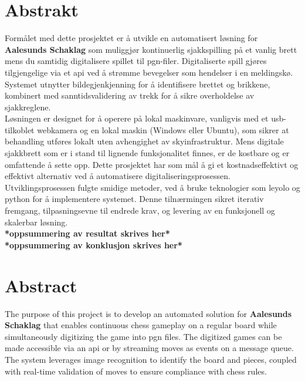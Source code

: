 \chapter*{Abstrakt}

Formålet med dette prosjektet er å utvikle en automatisert løsning for \textbf{Aalesunds Schaklag} som muliggjør kontinuerlig sjakkspilling på et vanlig brett mens du samtidig digitalisere spillet til \gls{pgn}-filer. Digitaliserte spill gjøres tilgjengelige via et \gls{api} ved å strømme bevegelser som hendelser i en meldingskø. Systemet utnytter bildegjenkjenning for å identifisere brettet og brikkene, kombinert med sanntidsvalidering av trekk for å sikre overholdelse av sjakkreglene. \\

Løsningen er designet for å operere på lokal maskinvare, vanligvis med et \acrshort{usb}-tilkoblet webkamera og en lokal maskin (Windows eller Ubuntu), som sikrer at behandling utføres lokalt uten avhengighet av skyinfrastruktur. Mens digitale sjakkbrett som er i stand til lignende funksjonalitet finnes, er de kostbare og er omfattende å sette opp. Dette prosjektet har som mål å gi et kostnadseffektivt og effektivt alternativ ved å automatisere digitaliseringsprosessen. \\

Utviklingsprosessen fulgte smidige metoder, ved å bruke teknologier som \gls{leyolo} og \gls{python} for å implementere systemet. Denne tilnærmingen sikret iterativ fremgang, tilpasningsevne til endrede krav, og levering av en funksjonell og skalerbar løsning. \\

\textbf{*oppsummering av resultat skrives her*}\\

\textbf{*oppsummering av konklusjon skrives her*}


\newpage


\chapter*{Abstract}

The purpose of this project is to develop an automated solution for \textbf{Aalesunds Schaklag} that enables continuous chess gameplay on a regular board while simultaneously digitizing the game into \gls{pgn} files. The digitized games can be made accessible via an \gls{api} or by streaming moves as events on a message queue. The system leverages image recognition to identify the board and pieces, coupled with real-time validation of moves to ensure compliance with chess rules.\\

